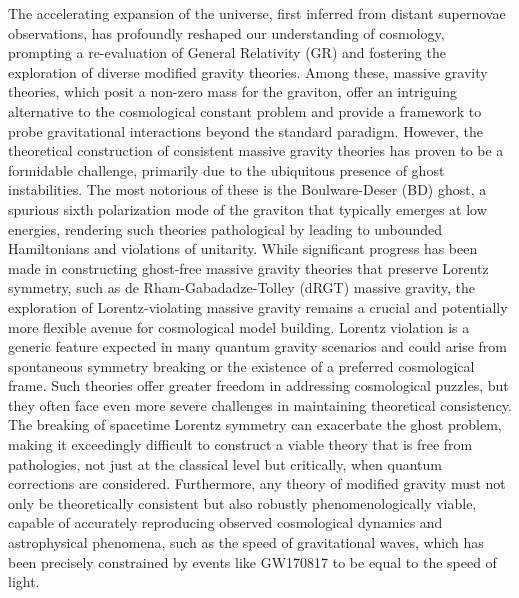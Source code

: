 \documentclass[twocolumn]{aastex631}
\begin{document}
The accelerating expansion of the universe, first inferred from distant supernovae observations, has profoundly reshaped our understanding of cosmology, prompting a re-evaluation of General Relativity (GR) and fostering the exploration of diverse modified gravity theories. Among these, massive gravity theories, which posit a non-zero mass for the graviton, offer an intriguing alternative to the cosmological constant problem and provide a framework to probe gravitational interactions beyond the standard paradigm. However, the theoretical construction of consistent massive gravity theories has proven to be a formidable challenge, primarily due to the ubiquitous presence of ghost instabilities. The most notorious of these is the Boulware-Deser (BD) ghost, a spurious sixth polarization mode of the graviton that typically emerges at low energies, rendering such theories pathological by leading to unbounded Hamiltonians and violations of unitarity. While significant progress has been made in constructing ghost-free massive gravity theories that preserve Lorentz symmetry, such as de Rham-Gabadadze-Tolley (dRGT) massive gravity, the exploration of Lorentz-violating massive gravity remains a crucial and potentially more flexible avenue for cosmological model building. Lorentz violation is a generic feature expected in many quantum gravity scenarios and could arise from spontaneous symmetry breaking or the existence of a preferred cosmological frame. Such theories offer greater freedom in addressing cosmological puzzles, but they often face even more severe challenges in maintaining theoretical consistency. The breaking of spacetime Lorentz symmetry can exacerbate the ghost problem, making it exceedingly difficult to construct a viable theory that is free from pathologies, not just at the classical level but critically, when quantum corrections are considered. Furthermore, any theory of modified gravity must not only be theoretically consistent but also robustly phenomenologically viable, capable of accurately reproducing observed cosmological dynamics and astrophysical phenomena, such as the speed of gravitational waves, which has been precisely constrained by events like GW170817 to be equal to the speed of light.
\end{document}
